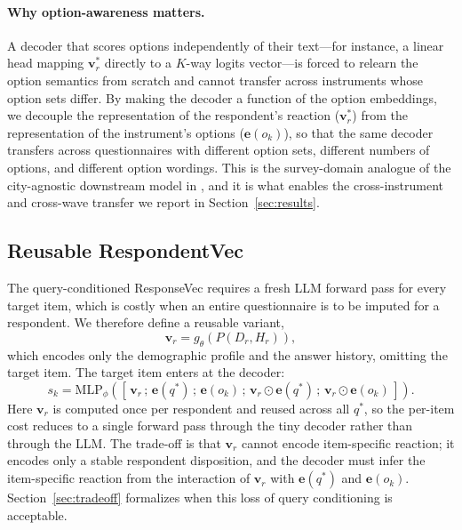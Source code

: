 \paragraph{Why option-awareness matters.} A decoder that scores options independently of their text---for instance, a linear head mapping $\mathbf{v}^\ast_r$ directly to a $K$-way logits vector---is forced to relearn the option semantics from scratch and cannot transfer across instruments whose option sets differ. By making the decoder a function of the option embeddings, we decouple the representation of the respondent's reaction ($\mathbf{v}^\ast_r$) from the representation of the instrument's options ($\mathbf{e}(o_k)$), so that the same decoder transfers across questionnaires with different option sets, different numbers of options, and different option wordings. This is the survey-domain analogue of the city-agnostic downstream model in \citet{he2025geolocation}, and it is what enables the cross-instrument and cross-wave transfer we report in Section~\ref{sec:results}.

\subsection{Reusable RespondentVec}
\label{sec:respondentvec}

The query-conditioned ResponseVec requires a fresh LLM forward pass for every target item, which is costly when an entire questionnaire is to be imputed for a respondent. We therefore define a reusable variant,
\begin{equation}
\mathbf{v}_r = g_\theta(P(D_r, H_r)),
\end{equation}
which encodes only the demographic profile and the answer history, omitting the target item. The target item enters at the decoder:
\begin{equation}
\label{eq:score_reuse}
s_k = \mathrm{MLP}_\phi\!\left( \left[\, \mathbf{v}_r \,;\, \mathbf{e}(q^\ast) \,;\, \mathbf{e}(o_k) \,;\, \mathbf{v}_r \odot \mathbf{e}(q^\ast) \,;\, \mathbf{v}_r \odot \mathbf{e}(o_k) \,\right] \right).
\end{equation}
Here $\mathbf{v}_r$ is computed once per respondent and reused across all $q^\ast$, so the per-item cost reduces to a single forward pass through the tiny decoder rather than through the LLM. The trade-off is that $\mathbf{v}_r$ cannot encode item-specific reaction; it encodes only a stable respondent disposition, and the decoder must infer the item-specific reaction from the interaction of $\mathbf{v}_r$ with $\mathbf{e}(q^\ast)$ and $\mathbf{e}(o_k)$. Section~\ref{sec:tradeoff} formalizes when this loss of query conditioning is acceptable.

